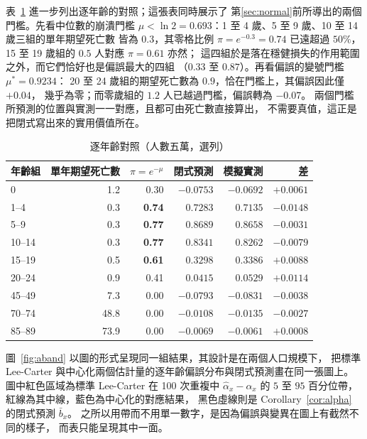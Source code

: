 \documentclass[UTF8, fontset=macnew, a4paper, 12pt]{ctexart}
\begin{document}
表~\ref{tab:validage} 進一步列出逐年齡的對照；這張表同時展示了
第\ref{sec:normal}前所導出的兩個門檻。先看中位數的崩潰門檻
$\mu<\ln2=0.693$：1 至 4 歲、5 至 9 歲、10 至 14 歲三組的單年期望死亡數
皆為 $0.3$，其零格比例 $\pi=e^{-0.3}=0.74$ 已遠超過 $50\%$，
15 至 19 歲組的 $0.5$ 人對應 $\pi=0.61$ 亦然；
這四組於是落在穩健損失的作用範圍之外，而它們恰好也是偏誤最大的四組
（$0.33$ 至 $0.87$）。再看偏誤的變號門檻 $\mu^\ast=0.9234$：
20 至 24 歲組的期望死亡數為 $0.9$，恰在門檻上，其偏誤因此僅 $+0.04$，
幾乎為零；而零歲組的 $1.2$ 人已越過門檻，偏誤轉為 $-0.07$。
兩個門檻所預測的位置與實測一一對應，且都可由死亡數直接算出，
不需要真值，這正是把閉式寫出來的實用價值所在。

\begin{table}[H]
\centering
\caption{逐年齡對照（人數五萬，選列）}
\small
\begin{tabular}{lrrrrr}
\toprule
年齡組 & 單年期望死亡數 & $\pi=e^{-\mu}$ & 閉式預測 & 模擬實測 & 差\\
\midrule
0      & 1.2  & 0.30 & $-0.0753$ & $-0.0692$ & $+0.0061$\\
1--4   & 0.3  & \textbf{0.74} & $0.7283$  & $0.7135$  & $-0.0148$\\
5--9   & 0.3  & \textbf{0.77} & $0.8689$  & $0.8658$  & $-0.0031$\\
10--14 & 0.3  & \textbf{0.77} & $0.8341$  & $0.8262$  & $-0.0079$\\
15--19 & 0.5  & \textbf{0.61} & $0.3298$  & $0.3386$  & $+0.0088$\\
20--24 & 0.9  & 0.41 & $0.0415$  & $0.0529$  & $+0.0114$\\
45--49 & 7.3  & 0.00 & $-0.0793$ & $-0.0831$ & $-0.0038$\\
70--74 & 48.8 & 0.00 & $-0.0108$ & $-0.0135$ & $-0.0027$\\
85--89 & 73.9 & 0.00 & $-0.0069$ & $-0.0061$ & $+0.0008$\\
\bottomrule
\end{tabular}
\label{tab:validage}
\end{table}

圖~\ref{fig:aband} 以圖的形式呈現同一組結果，其設計是在兩個人口規模下，
把標準 Lee-Carter 與中心化兩個估計量的逐年齡偏誤分布與閉式預測畫在同一張圖上。
圖中紅色區域為標準 Lee-Carter 在 100 次重複中 $\hat\alpha_x-\alpha_x$ 的
$5$ 至 $95$ 百分位帶，紅線為其中線，藍色為中心化的對應結果，
黑色虛線則是 Corollary~\ref{cor:alpha} 的閉式預測 $\bar b_x$。
之所以用帶而不用單一數字，是因為偏誤與變異在圖上有截然不同的樣子，
而表只能呈現其中一面。
\end{document}
